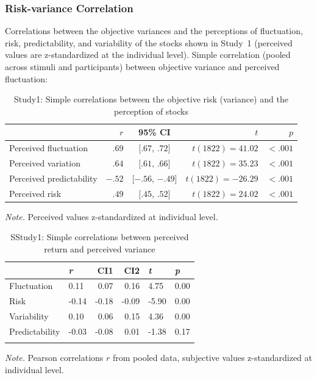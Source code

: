 \subsubsection{Risk-variance Correlation}
\label{study1_risk-variance-correlation}
Correlations between the objective variances and the perceptions of fluctuation, risk, predictability, and variability of the stocks shown in Study~1 (perceived values are z-standardized at the individual level). Simple correlation (pooled across stimuli and participants) between objective variance and perceived fluctuation:
\begin{table}[]
    \centering
    \begin{threeparttable}
    \caption{Study1: Simple correlations between the objective risk (variance) and the perception of stocks}
    \label{sup:tab:study1_rvc}
    \begin{tabular}{lrcrr}\toprule
         & $r$ &  95\% CI & $t$ & $p$ \\
          \midrule
        Perceived fluctuation & $.69$ & $[.67$, $.72]$ & $t(1822) = 41.02$ & $< .001$ \\
        Perceived variation & $.64$ & $[.61$, $.66]$ &  $t(1822) = 35.23$ & $< .001$\\
        Perceived predictability & $-.52$ &  $[-.56$, $-.49]$ & $t(1822) = -26.29$ &  $< .001$\\
        Perceived risk & $.49$ & $[.45$, $.52]$ & $t(1822) = 24.02$ & $< .001$\\
        \bottomrule
    \end{tabular}
    \begin{tablenotes}
    \textit{Note.} Perceived values z-standardized at individual level.
    \end{tablenotes}
    \end{threeparttable}
\end{table}

\begin{table}[H]
\begin{center}
\begin{threeparttable}
\caption{SStudy1: Simple correlations between perceived return and perceived variance
  \label{sup:tab:study1_rrc}}
\begin{tabular}{llrrll}
\toprule
 & \textit{r} & CI1 & CI2 & \textit{t} & \textit{p}\\
\midrule
Fluctuation & 0.11 & 0.07 & 0.16 & 4.75 & 0.00\\
Risk & -0.14 & -0.18 & -0.09 & -5.90 & 0.00\\
Variability & 0.10 & 0.06 & 0.15 & 4.36 & 0.00\\
Predictability & -0.03 & -0.08 & 0.01 & -1.38 & 0.17\\
\bottomrule
\addlinespace
\end{tabular}
\begin{tablenotes}[para]
\normalsize{\textit{Note.} Pearson correlations $r$ from pooled data, subjective values z-standardized at individual level.}
\end{tablenotes}
\end{threeparttable}
\end{center}
\end{table}


